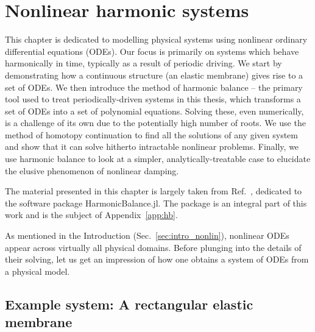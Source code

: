 
\chapter{Nonlinear harmonic systems} \label{ch:hb}


\begin{chapterabstract}
	
This chapter is dedicated to modelling physical systems using nonlinear ordinary differential equations (ODEs). Our focus is primarily on systems which behave harmonically in time, typically as a result of periodic driving. We start by demonstrating how a continuous structure (an elastic membrane) gives rise to a set of ODEs. We then introduce the method of harmonic balance -- the primary tool used to treat periodically-driven systems in this thesis, which transforms a set of ODEs into a set of polynomial equations. Solving these, even numerically, is a challenge of its own due to the potentially high number of roots. We use the method of homotopy continuation to find all the solutions of any given system and show that it can solve hitherto intractable nonlinear problems. Finally, we use harmonic balance to look at a simpler, analytically-treatable case to elucidate the elusive phenomenon of nonlinear damping. 

%
\tcblower
%
The material presented in this chapter is largely taken from Ref.~\cite{Kosata_2022a}, dedicated to the software package HarmonicBalance.jl. The package is an integral part of this work and is the subject of Appendix~\ref{app:hb}.
\end{chapterabstract} 

As mentioned in the Introduction (Sec.~\ref{sec:intro_nonlin}), nonlinear ODEs appear across virtually all physical domains. Before plunging into the details of their solving, let us get an impression of how one obtains a system of ODEs from a physical model.

\section{Example system: A rectangular elastic membrane} \label{sec:hb_membrane_eom}

